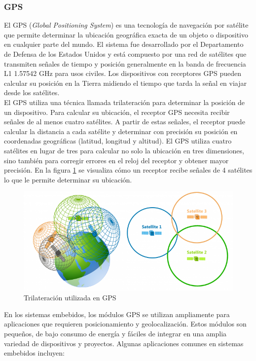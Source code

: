 \subsubsection{GPS}

El GPS (\textit{Global Positioning System}) es una tecnología de navegación por satélite que permite determinar la ubicación geográfica exacta de un objeto o dispositivo en cualquier parte del mundo. El sistema fue desarrollado por el Departamento de Defensa de los Estados Unidos \cite{gps} y está compuesto por una red de satélites que transmiten señales de tiempo y posición generalmente en la banda de frecuencia L1 1.57542 GHz para usos civiles. Los dispositivos con receptores GPS pueden calcular su posición en la Tierra midiendo el tiempo que tarda la señal en viajar desde los satélites. \\


El GPS utiliza una técnica llamada trilateración para determinar la posición de un dispositivo. Para calcular su ubicación, el receptor GPS necesita recibir señales de al menos cuatro satélites. A partir de estas señales, el receptor puede calcular la distancia a cada satélite y determinar con precisión su posición en coordenadas geográficas (latitud, longitud y altitud). El GPS utiliza cuatro satélites en lugar de tres para calcular no solo la ubicación en tres dimensiones, sino también para corregir errores en el reloj del receptor y obtener mayor precisión. En la figura \ref{fig:gps} se visualiza cómo un receptor recibe señales de 4 satélites lo que le permite determinar su ubicación. \\

\begin{figure}[H]
    \centering
    \includegraphics[width = 0.7 \linewidth]{img/gps.png}
    \caption{Trilateración utilizada en GPS \cite{gps_img}}
    \label{fig:gps}
\end{figure}



En los sistemas embebidos, los módulos GPS se utilizan ampliamente para aplicaciones que requieren posicionamiento y geolocalización. Estos módulos son pequeños, de bajo consumo de energía y fáciles de integrar en una amplia variedad de dispositivos y proyectos. Algunas aplicaciones comunes en sistemas embebidos incluyen:


